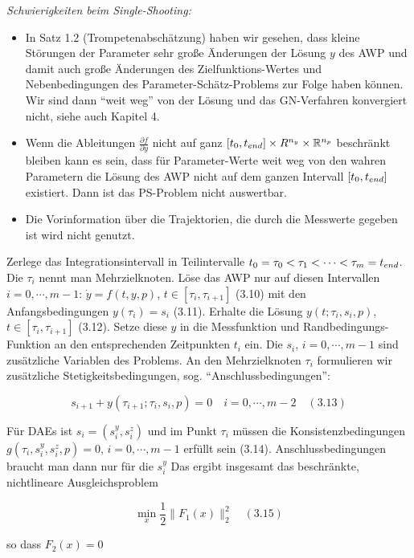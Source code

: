 \emph{Schwierigkeiten beim Single-Shooting:}

\begin{itemize}
\item In Satz 1.2 (Trompetenabschätzung) haben wir gesehen, dass kleine Störungen der Parameter sehr große Änderungen der Lösung $y$ des AWP und damit auch große Änderungen des Zielfunktions-Wertes und Nebenbedingungen des Parameter-Schätz-Problems zur Folge haben können. Wir sind dann "`weit weg"' von der Lösung und das GN-Verfahren konvergiert nicht, siehe auch Kapitel 4.
\item Wenn die Ableitungen $\tfrac{\partial f}{\partial y}$ nicht auf ganz $[t_0,t_{end}]\times R^{n_y} \times \mathbb{R}^{n_p}$  beschränkt bleiben kann es sein, dass für Parameter-Werte weit weg von den wahren Parametern die Lösung des AWP nicht auf dem ganzen Intervall $[t_0,t_{end}]$ existiert. Dann  ist das PS-Problem nicht auswertbar.
\item Die Vorinformation über die Trajektorien, die durch die Messwerte gegeben ist wird nicht genutzt.
\end{itemize}


Zerlege das Integrationsintervall in Teilintervalle $t_0 = \tau_0 < \tau_1 < \cdots < \tau_m = t_{end}$. Die $\tau_i$ nennt man Mehrzielknoten. Löse das AWP nur auf diesen Intervallen $i=0,\cdots,m-1$: $\dot y = f(t,y,p)$, $t \in [\tau_i, \tau_{i+1} ]$ (3.10) mit den Anfangsbedingungen $y(\tau_i) = s_i$ (3.11). Erhalte die Lösung $y(t; \tau_i, s_i,p)$, $t\in[\tau_i, \tau_{i+1}]$ (3.12). Setze diese $y$ in die Messfunktion und Randbedingungs-Funktion an den entsprechenden Zeitpunkten $t_i$ ein. Die $s_i$, $i=0,\cdots,m-1$ sind zusätzliche Variablen des Problems. An den Mehrzielknoten $\tau_i$ formulieren wir zusätzliche  Stetigkeitsbedingungen, sog. "`Anschlussbedingungen"':

\[ s_{i+1} + y(\tau_{i+1}; \tau_i, s_i, p) = 0 \quad i=0,\cdots,m-2 \quad (3.13)\]

Für DAEs ist $s_i = (s_i^y, s_i^z)$ und im Punkt $\tau_i$ müssen die Konsistenzbedingungen $g(\tau_i, s_i^y, s_i^z, p) = 0$, $i=0,\cdots,m-1$ erfüllt sein (3.14). Anschlussbedingungen braucht man dann nur für die $s_i^y$ Das ergibt insgesamt das beschränkte, nichtlineare Ausgleichsproblem

\[ \min_x \frac  12 \|F_1(x)\|_2^2 \quad (3.15) \]

so dass $F_2(x) = 0$

